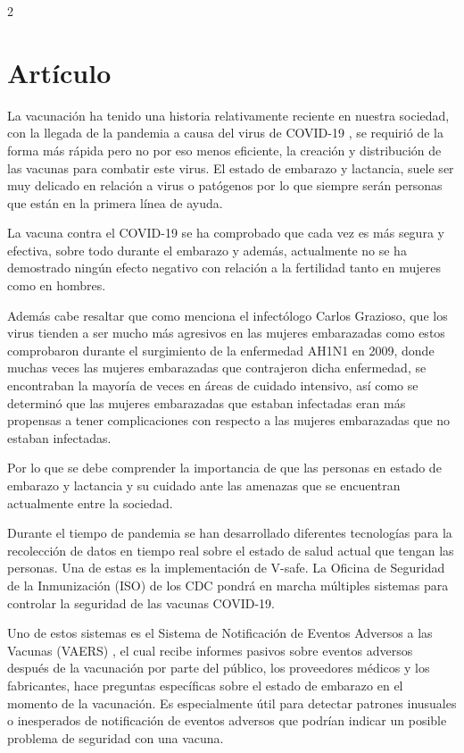 \documentclass[12pt,spanish,Letterpaper,openany]{book}
\begin{document}
\begin {multicols}{2}

\hypertarget{artuxedculo-1}{%
\section{Artículo}\label{artuxedculo-1}}

La vacunación ha tenido una historia relativamente reciente en nuestra sociedad, con la
llegada de la pandemia a causa del virus de COVID-19 , se requirió de la forma más rápida
pero no por eso menos eficiente, la creación y distribución de las vacunas para combatir este
virus. El estado de embarazo y lactancia, suele ser muy delicado en relación a virus o
patógenos por lo que siempre serán personas que están en la primera línea de ayuda.

La vacuna contra el COVID-19 se ha comprobado que cada vez es más segura y efectiva,
sobre todo durante el embarazo y además, actualmente no se ha demostrado ningún efecto
negativo con relación a la fertilidad tanto en mujeres como en hombres.

Además cabe resaltar que como menciona el infectólogo Carlos Grazioso, que los virus
tienden a ser mucho más agresivos en las mujeres embarazadas como estos comprobaron
durante el surgimiento de la enfermedad AH1N1 en 2009, donde muchas veces las mujeres
embarazadas que contrajeron dicha enfermedad, se encontraban la mayoría de veces en áreas
de cuidado intensivo, así como se determinó que las mujeres embarazadas que estaban
infectadas eran más propensas a tener complicaciones con respecto a las mujeres
embarazadas que no estaban infectadas.

Por lo que se debe comprender la importancia de que las personas en estado de embarazo y
lactancia y su cuidado ante las amenazas que se encuentran actualmente entre la sociedad.

Durante el tiempo de pandemia se han desarrollado diferentes tecnologías para la recolección
de datos en tiempo real sobre el estado de salud actual que tengan las personas. Una de estas
es la implementación de V-safe. La Oficina de Seguridad de la Inmunización (ISO) de los
CDC pondrá en marcha múltiples sistemas para controlar la seguridad de las vacunas
COVID-19.

Uno de estos sistemas es el Sistema de Notificación de Eventos Adversos a las Vacunas
(VAERS) , el cual recibe informes pasivos sobre eventos adversos después de la vacunación
por parte del público, los proveedores médicos y los fabricantes, hace preguntas específicas
sobre el estado de embarazo en el momento de la vacunación. Es especialmente útil para
detectar patrones inusuales o inesperados de notificación de eventos adversos que podrían
indicar un posible problema de seguridad con una vacuna.


\end{multicols}
\end{document}
